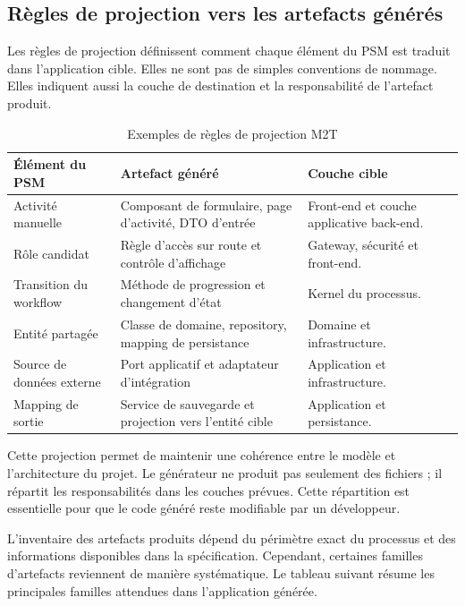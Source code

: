 \subsection{Règles de projection vers les artefacts générés}

Les règles de projection définissent comment chaque élément du PSM est traduit dans l'application cible. Elles ne sont pas de simples conventions de nommage. Elles indiquent aussi la couche de destination et la responsabilité de l'artefact produit.

\begin{table}[H]
\centering
\small
\caption{Exemples de règles de projection M2T}
\label{tab:chap3-projection-m2t}
\begin{tabular}{p{3.7cm}p{4.4cm}p{5.8cm}}
\hline
\textbf{Élément du PSM} & \textbf{Artefact généré} & \textbf{Couche cible} \\
\hline
Activité manuelle & Composant de formulaire, page d'activité, DTO d'entrée & Front-end et couche applicative back-end. \\
Rôle candidat & Règle d'accès sur route et contrôle d'affichage & Gateway, sécurité et front-end. \\
Transition du workflow & Méthode de progression et changement d'état & Kernel du processus. \\
Entité partagée & Classe de domaine, repository, mapping de persistance & Domaine et infrastructure. \\
Source de données externe & Port applicatif et adaptateur d'intégration & Application et infrastructure. \\
Mapping de sortie & Service de sauvegarde et projection vers l'entité cible & Application et persistance. \\
\hline
\end{tabular}
\end{table}

Cette projection permet de maintenir une cohérence entre le modèle et l'architecture du projet. Le générateur ne produit pas seulement des fichiers ; il répartit les responsabilités dans les couches prévues. Cette répartition est essentielle pour que le code généré reste modifiable par un développeur.

L'inventaire des artefacts produits dépend du périmètre exact du processus et des informations disponibles dans la spécification. Cependant, certaines familles d'artefacts reviennent de manière systématique. Le tableau suivant résume les principales familles attendues dans l'application générée.

